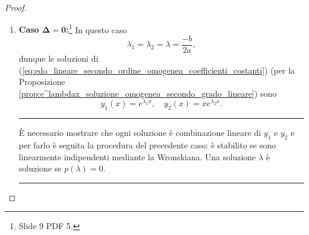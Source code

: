 \begin{proof}
\begin{enumerate}
		\paragraph{Intermezzo:}(\ref{eq:edo_variabili_separabili_dimostrazione_integrale_generale_edo_seecondo_grado}) è a variabili separabili. Dato che $v(x)=u'(x)$, allora $u'(x)=ce^{(\lambda_2-\lambda_1)x}$ e $v(x)=ce^{(\lambda_2-\lambda_1)x}$. Quindi è possibile integrare, tenendo di conto che $e^{(\lambda_2-\lambda_1)x}$ è un esponenziale è necessaria una correzione del coefficiente $c$ affinché $\lambda_1-\lambda_2\neq 0$. Ciò non è scritto esplicitamente, è denotata una costante $c_1=\frac{c}{\lambda_2-\lambda_1}$ tale che $u(x) = c_1 e^{\lambda_1-\lambda_2}$. Quanto descritto è formalizzato in seguito.$\qed$
		
		\noindent Integrando
		\begin{equation*}
			u'(x)=c\cdot e^{(\lambda_2-\lambda_1)x},\quad u(x)=\int u'(x)\,dx,
		\end{equation*}
		è ottenuto
		\begin{equation*}
			u(x)=\underset{\footnotemark}{c_1}\cdot e^{(\lambda_2-\lambda_1)x}+\underset{\footnotemark}{c_2},\quad c_1,c_2\in\mathbb{R},
		\end{equation*}
		essendo
		\begin{equation*}
			z(x)=e^{\lambda_1 x}u(x)\overset{\text{sost.}}{=}e^{\lambda_1x}\left[c_1\cdot e^{(\lambda_2-\lambda_1)x}+c_2\right] = c_1\cdot e^{\lambda_2 x} + c_2\cdot e^{\lambda_1 x}.
		\end{equation*}
		
		\addtocounter{footnote}{-1}
		
		
		\item \textbf{Caso $\boldsymbol{\Delta=0}$:}\footnote{Slide 9 PDF 5.} In questo caso
		\begin{equation*}
			\lambda_1=\lambda_2=\lambda=\frac{-b}{2a},
		\end{equation*}
		dunque le soluzioni di (\ref{eq:edo_lineare_secondo_ordine_omogenea_coefficienti_costanti}) (per la Proposizione \ref{prop:e^lambdax_soluzione_omogenea_secondo_grado_lineare}) sono
		\begin{equation*}
			y_1(x)=e^{\lambda_1 x},\quad y_2(x) = xe^{\lambda_2 x}.
		\end{equation*}
		\hrule\vspace{-2px}
		È necessario mostrare che ogni soluzione è combinazione lineare di $y_1$ e $y_2$ e per farlo è seguita la procedura del precedente caso: è stabilito se sono linearmente indipendenti mediante la Wronskiana. Una soluzione $\lambda$ è soluzione se $p(\lambda)=0$.
		\hrule\vspace{2px}
		

\end{enumerate}
\end{proof}
